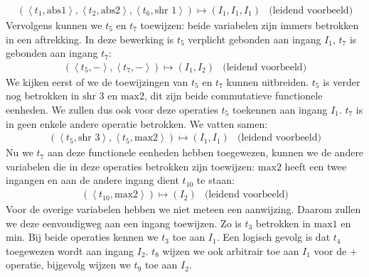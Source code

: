 \begin{equation}
\begin{array}{lr}
\left(\left\langle t_1,\mbox{abs1}\right\rangle,\left\langle t_2,\mbox{abs2}\right\rangle,\left\langle t_6,\mbox{shr 1}\right\rangle\right)\mapsto\left(I_1,I_1,I_1\right)&\mbox{(leidend voorbeeld)}
\end{array}
\end{equation}
Vervolgens kunnen we $t_5$ en $t_7$ toewijzen: beide variabelen zijn immers betrokken in een aftrekking. In deze bewerking is $t_5$ verplicht gebonden aan ingang $I_1$, $t_7$ is gebonden aan ingang $t_7$:
\begin{equation}
\begin{array}{lr}
\left(\left\langle t_5,-\right\rangle,\left\langle t_7,-\right\rangle\right)\mapsto\left(I_1,I_2\right)&\mbox{(leidend voorbeeld)}
\end{array}
\end{equation}
We kijken eerst of we de toewijzingen van $t_5$ en $t_7$ kunnen uitbreiden. $t_5$ is verder nog betrokken in $\mbox{shr 3}$ en $\mbox{max2}$, dit zijn beide commutatieve functionele eenheden. We zullen dus ook voor deze operaties $t_5$ toekennen aan ingang $I_1$. $t_7$ is in geen enkele andere operatie betrokken. We vatten samen:
\begin{equation}
\begin{array}{lr}
\left(\left\langle t_5,\mbox{shr 3}\right\rangle,\left\langle t_5,\mbox{max2}\right\rangle\right)\mapsto\left(I_1,I_1\right)&\mbox{(leidend voorbeeld)}
\end{array}
\end{equation}
Nu we $t_7$ aan deze functionele eenheden hebben toegewezen, kunnen we de andere variabelen die in deze operaties betrokken zijn toewijzen: $\mbox{max2}$ heeft een twee ingangen en aan de andere ingang dient $t_{10}$ te staan:
\begin{equation}
\begin{array}{lr}
\left(\left\langle t_{10},\mbox{max2}\right\rangle\right)\mapsto\left(I_2\right)&\mbox{(leidend voorbeeld)}
\end{array}
\end{equation}
Voor de overige variabelen hebben we niet meteen een aanwijzing. Daarom zullen we deze eenvoudigweg aan een ingang toewijzen. Zo is $t_3$ betrokken in $\mbox{max1}$ en $\mbox{min}$. Bij beide operaties kennen we $t_3$ toe aan $I_1$. Een logisch gevolg is dat $t_4$ toegewezen wordt aan ingang $I_2$. $t_8$ wijzen we ook arbitrair toe aan $I_1$ voor de $+$ operatie, bijgevolg wijzen we $t_9$ toe aan $I_2$.
